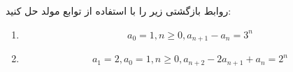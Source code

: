     \p 
روابط بازگشتی زیر را با استفاده از توابع مولد حل کنید:
\begin{enumerate}
\item
$$a_0 = 1, n \geq 0, a_{n+1} - a_n = 3^n$$
\item
$$a_1 = 2, a_0 = 1, n \geq 0, a_{n+2} - 2a_{n+1} + a_n = 2^n$$
\end{enumerate}